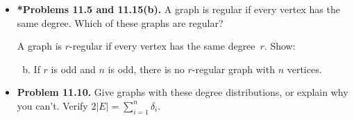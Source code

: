 \documentclass[11pt]{article}
\begin{document}
\begin{itemize}
\vspace{0.1in}

\item \textbf{*Problems 11.5 and 11.15(b).}
A graph is regular if every vertex has the same degree.
Which of these graphs are regular?
\begin{enumerate}[(a)]
\end{enumerate}
A graph is $r$-regular if every vertex has the same degree~$r$. Show:
\begin{enumerate}[(a)]
\setcounter{enumi}{1}
\item If $r$ is odd and $n$ is odd, there is no $r$-regular graph with $n$ vertices.
\end{enumerate}

\vspace{0.1in}

\item \textbf{Problem 11.10.}
Give graphs with these degree distributions, or explain why you can't.
Verify $2|E|=\displaystyle\sum_{i=1}^n \delta_i$.
\begin{enumerate}[(a)]
\end{enumerate}

\vspace{0.1in}


\end{itemize}
\end{document}
